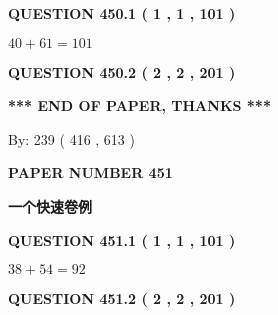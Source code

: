 \documentclass{ctexart}
\begin{document}
   
  
\vspace{0.2in}
  
{\textbf{\Large{QUESTION
450.1 
 ( 1 , 1 , 101 )
}}}
  
  
 
 

$ %
40 +  %
61=   %
101$
 
 
  
\vspace{0.2in}
  
{\textbf{\Large{QUESTION
450.2 
 ( 2 , 2 , 201 )
}}}
  
  
   
   
 \vspace{0.2in}
 
   
   
   
   
\vspace{1.0in} 
{\textbf{\large{ *** END OF PAPER, THANKS *** }}} 
   
   
\hspace{1.0in} By: 
 239 ( 416 ,  613 )
   
   
   
   
\newpage 
\setcounter{page}{ 
   451001 } 
   
   
   
   
 {\textbf{ \Large{ PAPER NUMBER  451  }}}
   
   
\vspace{0.2in}
   
   
   
   
   
   
 \vspace{0.2in}
{\LARGE {\textbf{ 一个快速卷例}}}
   
   
  
\vspace{0.2in}
  
{\textbf{\Large{QUESTION
451.1 
 ( 1 , 1 , 101 )
}}}
  
  
 
 

$ %
38 +  %
54=   %
92$
 
 
  
\vspace{0.2in}
  
{\textbf{\Large{QUESTION
451.2 
 ( 2 , 2 , 201 )
}}}
  
  
   
\end{document}
